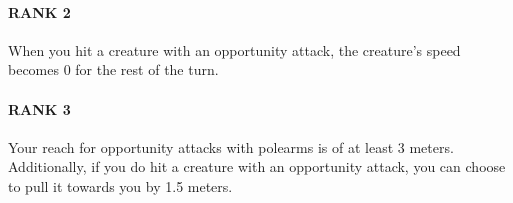 \paragraph{RANK 2} When you hit a creature with an opportunity attack, the creature's speed becomes 0 for the rest of the turn.
\paragraph{RANK 3} Your reach for opportunity attacks with polearms is of at least 3 meters.
Additionally, if you do hit a creature with an opportunity attack, you can choose to pull it towards you by 1.5 meters.

